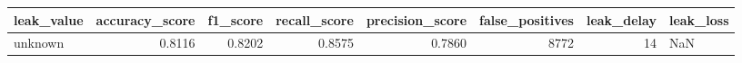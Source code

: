 \begin{tabular}{lrrrrrrl}
\toprule
leak\_value & accuracy\_score & f1\_score & recall\_score & precision\_score & false\_positives & leak\_delay & leak\_loss \\
\midrule
unknown & 0.8116 & 0.8202 & 0.8575 & 0.7860 & 8772 & 14 & NaN \\
\bottomrule
\end{tabular}
